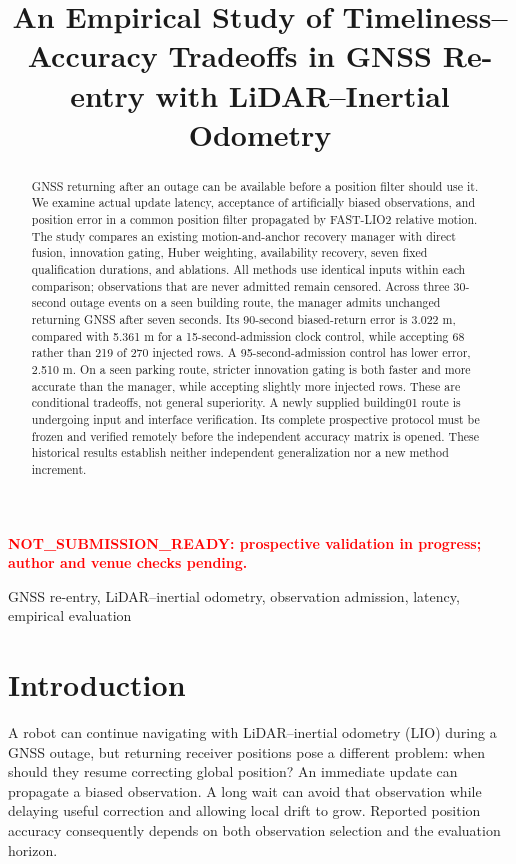 \documentclass[conference]{IEEEtran}
\title{An Empirical Study of Timeliness--Accuracy Tradeoffs in GNSS Re-entry with LiDAR--Inertial Odometry}
\author{\IEEEauthorblockN{Internal author-review draft: authors and affiliations unassigned}}
\newcommand{\reviewmark}{\textcolor{red}{\textbf{NOT\_SUBMISSION\_READY: prospective validation in progress; author and venue checks pending.}}}
\begin{document}
\maketitle
\begin{center}\small\reviewmark\end{center}
\begin{abstract}
GNSS returning after an outage can be available before a position filter should use it. We examine actual update latency, acceptance of artificially biased observations, and position error in a common position filter propagated by FAST-LIO2 relative motion. The study compares an existing motion-and-anchor recovery manager with direct fusion, innovation gating, Huber weighting, availability recovery, seven fixed qualification durations, and ablations. All methods use identical inputs within each comparison; observations that are never admitted remain censored. Across three 30-second outage events on a seen building route, the manager admits unchanged returning GNSS after seven seconds. Its 90-second biased-return error is 3.022 m, compared with 5.361 m for a 15-second-admission clock control, while accepting 68 rather than 219 of 270 injected rows. A 95-second-admission control has lower error, 2.510 m. On a seen parking route, stricter innovation gating is both faster and more accurate than the manager, while accepting slightly more injected rows. These are conditional tradeoffs, not general superiority. A newly supplied building01 route is undergoing input and interface verification. Its complete prospective protocol must be frozen and verified remotely before the independent accuracy matrix is opened. These historical results establish neither independent generalization nor a new method increment.
\end{abstract}
\begin{IEEEkeywords}GNSS re-entry, LiDAR--inertial odometry, observation admission, latency, empirical evaluation\end{IEEEkeywords}

\section{Introduction}
A robot can continue navigating with LiDAR--inertial odometry (LIO) during a GNSS outage, but returning receiver positions pose a different problem: when should they resume correcting global position? An immediate update can propagate a biased observation. A long wait can avoid that observation while delaying useful correction and allowing local drift to grow. Reported position accuracy consequently depends on both observation selection and the evaluation horizon.
\end{document}
